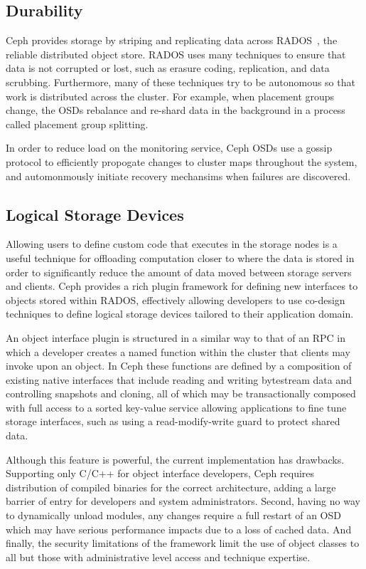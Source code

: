 \documentclass[10pt,twocolumn]{article}
\begin{document}
\subsection{Durability}
\label{sec:durability}

Ceph provides storage by striping and replicating data across
RADOS~\cite{weil_rados_2007}, the reliable distributed object store. RADOS
uses many techniques to ensure that data is not corrupted or lost, such as
erasure coding, replication, and data scrubbing. Furthermore, many of these
techniques try to be autonomous so that work is distributed across the
cluster. For example, when placement groups change, the OSDs rebalance and
re-shard data in the background in a process called placement group splitting.

In order to reduce load on the monitoring service, Ceph OSDs use a gossip
protocol to efficiently propogate changes to cluster maps throughout the
system, and automonmously initiate recovery mechansims when failures are
discovered.

\subsection{Logical Storage Devices}
\label{active-storage}

Allowing users to define custom code that executes in the storage nodes is a 
useful technique for offloading computation closer to where the data is stored 
in order to significantly reduce the amount of data moved between storage 
servers and clients. Ceph provides a rich plugin framework for defining new 
interfaces to objects
stored within RADOS, effectively allowing developers to use co-design
techniques to define logical storage devices tailored to their application
domain.

An object interface plugin is structured in a similar way to that of an RPC in
which a developer creates a named function within the cluster that clients may
invoke upon an object. In Ceph these functions are defined by a composition of
existing native interfaces that include reading and writing bytestream data
and controlling snapshots and cloning, all of which may be transactionally
composed with full access to a sorted key-value service allowing applications
to fine tune storage interfaces, such as using a read-modify-write guard to
protect shared data.

Although this feature is powerful, the current implementation has drawbacks.
Supporting only C/C++ for object interface developers, Ceph requires
distribution of compiled binaries for the correct architecture, adding a
large barrier of entry for developers and system administrators. Second,
having no way to dynamically unload modules, any changes require a full
restart of an OSD which may have serious performance impacts due to a loss
of cached data. And finally, the security limitations of the framework
limit the use of object classes to all but those with administrative level
access and technique expertise.
\end{document}
